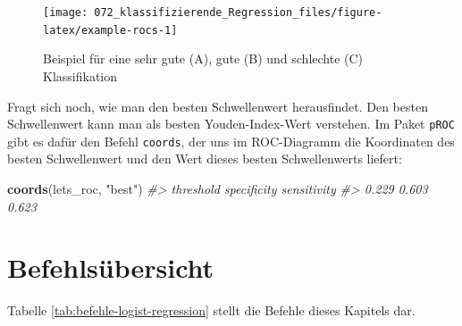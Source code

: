 \documentclass[12pt,ngerman,]{book}
\makeatletter
\newenvironment{Shaded}{\begin{snugshade}}{\end{snugshade}}
\newcommand{\KeywordTok}[1]{\textcolor[rgb]{0.13,0.29,0.53}{\textbf{{#1}}}}
\newcommand{\StringTok}[1]{\textcolor[rgb]{0.31,0.60,0.02}{{#1}}}
\newcommand{\CommentTok}[1]{\textcolor[rgb]{0.56,0.35,0.01}{\textit{{#1}}}}
\newcommand{\NormalTok}[1]{{#1}}
\newenvironment{kframe}{%
\medskip{}
\setlength{\fboxsep}{.8em}
 \def\at@end@of@kframe{}%
 \ifinner\ifhmode%
  \def\at@end@of@kframe{\end{minipage}}%
  \begin{minipage}{\columnwidth}%
 \fi\fi%
 \def\FrameCommand##1{\hskip\@totalleftmargin \hskip-\fboxsep
 \colorbox{shadecolor}{##1}\hskip-\fboxsep
     \hskip-\linewidth \hskip-\@totalleftmargin \hskip\columnwidth}%
 \MakeFramed {\advance\hsize-\width
   \@totalleftmargin\z@ \linewidth\hsize
   \@setminipage}}%
 {\par\unskip\endMakeFramed%
 \at@end@of@kframe}
\renewenvironment{Shaded}{\begin{kframe}}{\end{kframe}}
\theoremstyle{definition}
\theoremstyle{definition}
\theoremstyle{remark}
\makeatother
\begin{document}
\begin{figure}

{\centering \texttt{[image: 072\_klassifizierende\_Regression\_files/figure-latex/example-rocs-1]} 

}

\caption{Beispiel für eine sehr gute (A), gute (B) und schlechte (C) Klassifikation}\label{fig:example-rocs}
\end{figure}

Fragt sich noch, wie man den besten Schwellenwert herausfindet. Den
besten Schwellenwert kann man als besten Youden-Index-Wert verstehen. Im
Paket \texttt{pROC} gibt es dafür den Befehl \texttt{coords}, der uns im
ROC-Diagramm die Koordinaten des besten Schwellenwert und den Wert
dieses besten Schwellenwerts liefert:

\begin{Shaded}
\begin{Highlighting}[]
\KeywordTok{coords}\NormalTok{(lets_roc, }\StringTok{"best"}\NormalTok{)}
\CommentTok{#>   threshold specificity sensitivity }
\CommentTok{#>       0.229       0.603       0.623}
\end{Highlighting}
\end{Shaded}

\section{Befehlsübersicht}\label{befehlsubersicht-7}

Tabelle \ref{tab:befehle-logist-regression} stellt die Befehle dieses
Kapitels dar.
\end{document}
